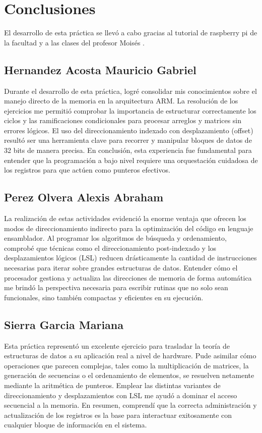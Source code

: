 \section{Conclusiones}
El desarrollo de esta práctica se llevó a cabo gracias al tutorial de raspberry pi de la facultad \cite{FI_UNAM_Raspberry_2026} y a las clases del profesor Moisés \cite{Melendez_Reyes_2026}.

\subsection{Hernandez Acosta Mauricio Gabriel}
Durante el desarrollo de esta práctica, logré consolidar mis conocimientos sobre el manejo directo de la memoria en la arquitectura ARM. La resolución de los ejercicios me permitió comprobar la importancia de estructurar correctamente los ciclos y las ramificaciones condicionales para procesar arreglos y matrices sin errores lógicos. El uso del direccionamiento indexado con desplazamiento (offset) resultó ser una herramienta clave para recorrer y manipular bloques de datos de 32 bits de manera precisa. En conclusión, esta experiencia fue fundamental para entender que la programación a bajo nivel requiere una orquestación cuidadosa de los registros para que actúen como punteros efectivos.

\subsection{Perez Olvera Alexis Abraham}
La realización de estas actividades evidenció la enorme ventaja que ofrecen los modos de direccionamiento indirecto para la optimización del código en lenguaje ensamblador. Al programar los algoritmos de búsqueda y ordenamiento, comprobé que técnicas como el direccionamiento post-indexado y los desplazamientos lógicos (LSL) reducen drásticamente la cantidad de instrucciones necesarias para iterar sobre grandes estructuras de datos. Entender cómo el procesador gestiona y actualiza las direcciones de memoria de forma automática me brindó la perspectiva necesaria para escribir rutinas que no solo sean funcionales, sino también compactas y eficientes en su ejecución.

\subsection{Sierra Garcia Mariana}
Esta práctica representó un excelente ejercicio para trasladar la teoría de estructuras de datos a su aplicación real a nivel de hardware. Pude asimilar cómo operaciones que parecen complejas, tales como la multiplicación de matrices, la generación de secuencias o el ordenamiento de elementos, se resuelven netamente mediante la aritmética de punteros. Emplear las distintas variantes de direccionamiento y desplazamientos con LSL me ayudó a dominar el acceso secuencial a la memoria. En resumen, comprendí que la correcta administración y actualización de los registros es la base para interactuar exitosamente con cualquier bloque de información en el sistema.